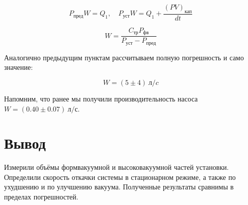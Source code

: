 \documentclass[a4paper, 12pt]{article}
\begin{document}
		    $$P_{пред}W = Q_1, \quad P_{уст}W = Q_1 + \frac{(PV)_{кап}}{dt}$$

            $$W = \frac{C_{тр} P_{фв}}{P_{уст} - P_{пред}}$$

            Аналогично предыдущим пунктам рассчитываем полную погрешность и само значение:

            $$W = (5 \pm 4)~л/c$$

            Напомним, что ранее мы получили производительность насоса $W = (0.40 \pm 0.07)~л/с$.

    \section{Вывод}

        Измерили объёмы формвакуумной и высоковакуумной частей установки. Определили скорость откачки системы в стационарном режиме, а также по ухудшению и по улучшению вакуума. Полученные результаты сравнимы в пределах погрешностей.
\end{document}
